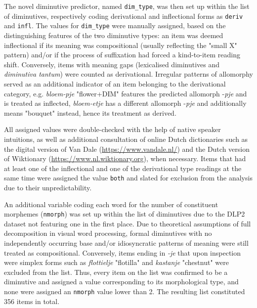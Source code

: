 The novel diminutive predictor, named \texttt{dim\_type}, was then set up within the list of diminutives, respectively coding derivational and inflectional forms as \texttt{deriv} and \texttt{infl}. The values for \texttt{dim\_type} were manually assigned, based on the  distinguishing features of the two diminutive types: an item was deemed inflectional if its meaning was compositional (usually reflecting the "small X" pattern) and/or if the process of suffixation had forced a kind-to-item reading shift. Conversely, items with meaning gaps (lexicalised diminutives and \textit{diminutiva tantum}) were counted as derivational. Irregular patterns of allomorphy served as an additional indicator of an item belonging to the derivational category, e.g. \textit{bloem-pje} "flower+DIM" features the predicted allomorph -\textit{pje} and is treated as inflected, \textit{bloem-etje} has a different allomorph -\textit{pje} and additionally means "bouquet" instead, hence its treatment as derived. 

All assigned values were double-checked with the help of native speaker intuitions, as well as additional consultation of online Dutch dictionaries such as the digital version of Van Dale (\url{https://www.vandale.nl/}) and the Dutch version of Wiktionary (\url{https://www.nl.wiktionary.org}), when necessary. Items that had at least one of the inflectional and one of the derivational type readings at the same time were assigned the value \texttt{both} and slated for exclusion from the analysis due to their unpredictability.

An additional variable coding each word for the number of constituent morphemes (\texttt{nmorph}) was set up within the list of diminutives due to the DLP2 dataset not featuring one in the first place. Due to theoretical assumptions of full decomposition in visual word processing, formal diminutives with no independently occurring base and/or idiosyncratic patterns of meaning were still treated as compositional. Conversely, items ending in \textit{-je} that upon inspection were simplex forms such as \textit{flottielje} "flotilla" and \textit{kastanje} "chestnut" were excluded from the list. Thus, every item on the list was confirmed to be a diminutive and assigned a value corresponding to its morphological type, and none were assigned an \texttt{nmorph} value lower than 2. The resulting list constituted 356 items in total.

